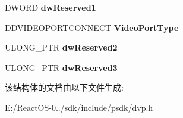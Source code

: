 \begin{DoxyCompactItemize}
\mbox{\label{struct___d_d_v_i_d_e_o_p_o_r_t_d_e_s_c_a300c591100933fc53ad250c931e92b14}} 
D\+W\+O\+RD {\bfseries dw\+Reserved1}
\item 
\mbox{\label{struct___d_d_v_i_d_e_o_p_o_r_t_d_e_s_c_a40ca5c0d53a9d8a7c0e2d4bac71defa2}} 
\hyperlink{struct___d_d_v_i_d_e_o_p_o_r_t_c_o_n_n_e_c_t}{D\+D\+V\+I\+D\+E\+O\+P\+O\+R\+T\+C\+O\+N\+N\+E\+CT} {\bfseries Video\+Port\+Type}
\item 
\mbox{\label{struct___d_d_v_i_d_e_o_p_o_r_t_d_e_s_c_acc2178c61fc88c340faacee1f10a5693}} 
U\+L\+O\+N\+G\+\_\+\+P\+TR {\bfseries dw\+Reserved2}
\item 
\mbox{\label{struct___d_d_v_i_d_e_o_p_o_r_t_d_e_s_c_a7554cbc8acf6b8e9f7afd0cd0a21ffc3}} 
U\+L\+O\+N\+G\+\_\+\+P\+TR {\bfseries dw\+Reserved3}
\end{DoxyCompactItemize}


该结构体的文档由以下文件生成\+:\begin{DoxyCompactItemize}
\item 
E\+:/\+React\+O\+S-\/0../sdk/include/psdk/dvp.\+h\end{DoxyCompactItemize}
